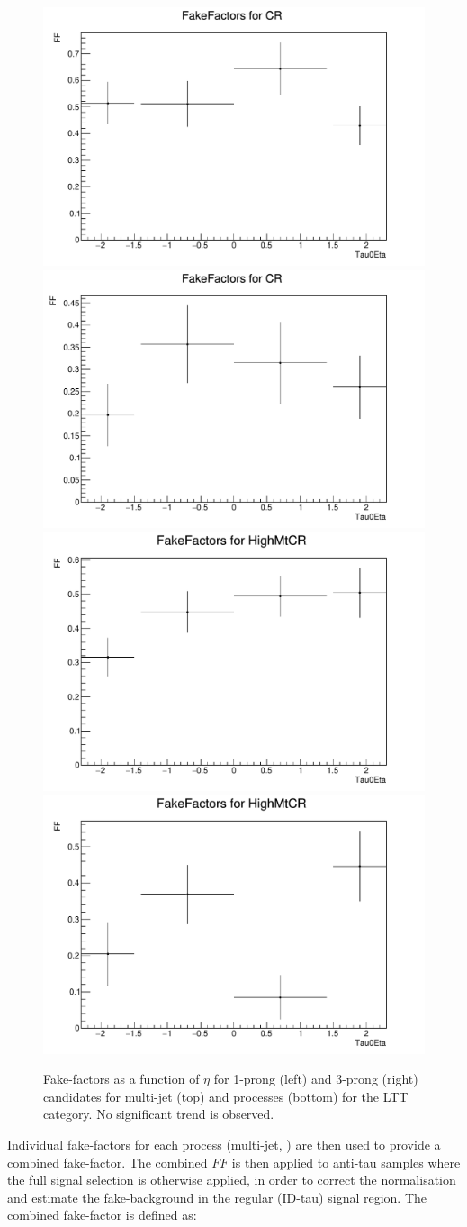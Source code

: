 \begin{figure}
\centering
\includegraphics[width=.4\textwidth]{figures/lephadFF/LTT/FF_All_Preselection_Np1_CR_2tag_Tau0Eta}
\includegraphics[width=.4\textwidth]{figures/lephadFF/LTT/FF_All_Preselection_Np3_CR_2tag_Tau0Eta} \\
\includegraphics[width=.4\textwidth]{figures/lephadFF/LTT/FF_All_Preselection_Np1_HighMtCR_2tag_Tau0Eta}
\includegraphics[width=.4\textwidth]{figures/lephadFF/LTT/FF_All_Preselection_Np3_HighMtCR_2tag_Tau0Eta}\\
\caption{Fake-factors as a function of $\eta$ for 1-prong (left) and 3-prong (right) \tauhad candidates for multi-jet (top) and \ttbar processes (bottom) for the \lephad LTT category. No significant trend is observed.}
\label{fig:lhFF_eta_LTT}
\end{figure}


Individual fake-factors for each process (multi-jet, \ttbar) are then used to provide a combined fake-factor. 
The combined $FF$ is then applied to anti-tau samples where the full signal selection is otherwise applied, 
in order to correct the normalisation and estimate the fake-\tauhad background in the regular (ID-tau) signal region. 
The combined fake-factor is defined as:

